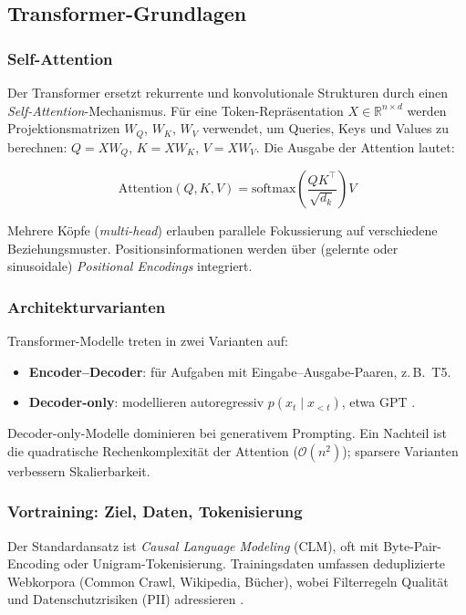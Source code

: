 \subsection{Transformer-Grundlagen}

\subsubsection{Self-Attention}

Der Transformer ersetzt rekurrente und konvolutionale Strukturen durch einen \emph{Self-Attention}-Mechanismus. Für eine Token-Repräsentation $X \in \mathbb{R}^{n \times d}$ werden Projektionsmatrizen $W_Q$, $W_K$, $W_V$ verwendet, um Queries, Keys und Values zu berechnen: $Q = XW_Q$, $K = XW_K$, $V = XW_V$. Die Ausgabe der Attention lautet:

\[
\mathrm{Attention}(Q,K,V) = \mathrm{softmax}\left( \frac{QK^\top}{\sqrt{d_k}} \right) V
\]

Mehrere Köpfe (\emph{multi-head}) erlauben parallele Fokussierung auf verschiedene Beziehungsmuster. Positionsinformationen werden über (gelernte oder sinusoidale) \emph{Positional Encodings} integriert.

\subsubsection{Architekturvarianten}

Transformer-Modelle treten in zwei Varianten auf:

\begin{itemize}
    \item \textbf{Encoder–Decoder}: für Aufgaben mit Eingabe–Ausgabe-Paaren, z.\,B.\ T5.
    \item \textbf{Decoder-only}: modellieren autoregressiv $p(x_t \mid x_{<t})$, etwa GPT \cite{brown2020language}.
\end{itemize}

Decoder-only-Modelle dominieren bei generativem Prompting. Ein Nachteil ist die quadratische Rechenkomplexität der Attention ($\mathcal{O}(n^2)$); sparsere Varianten verbessern Skalierbarkeit.

\subsubsection{Vortraining: Ziel, Daten, Tokenisierung}

Der Standardansatz ist \emph{Causal Language Modeling} (CLM), oft mit Byte-Pair-Encoding oder Unigram-Tokenisierung. Trainingsdaten umfassen deduplizierte Webkorpora (Common Crawl, Wikipedia, Bücher), wobei Filterregeln Qualität und Datenschutzrisiken (PII) adressieren \cite{brown2020language}.

